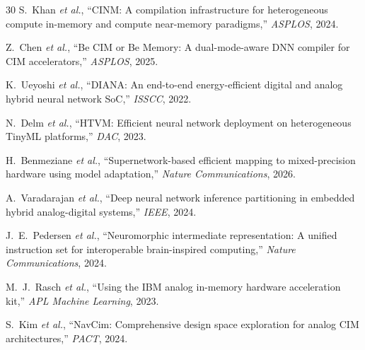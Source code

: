 \documentclass[11pt]{article}
\begin{document}
\begin{thebibliography}{30}
 S.~Khan \textit{et al.}, ``CINM: A compilation infrastructure for heterogeneous compute in-memory and compute near-memory paradigms,'' \textit{ASPLOS}, 2024.

 Z.~Chen \textit{et al.}, ``Be CIM or Be Memory: A dual-mode-aware DNN compiler for CIM accelerators,'' \textit{ASPLOS}, 2025.

 K.~Ueyoshi \textit{et al.}, ``DIANA: An end-to-end energy-efficient digital and analog hybrid neural network SoC,'' \textit{ISSCC}, 2022.

 N.~Delm \textit{et al.}, ``HTVM: Efficient neural network deployment on heterogeneous TinyML platforms,'' \textit{DAC}, 2023.

 H.~Benmeziane \textit{et al.}, ``Supernetwork-based efficient mapping to mixed-precision hardware using model adaptation,'' \textit{Nature Communications}, 2026.

 A.~Varadarajan \textit{et al.}, ``Deep neural network inference partitioning in embedded hybrid analog-digital systems,'' \textit{IEEE}, 2024.

 J.~E.~Pedersen \textit{et al.}, ``Neuromorphic intermediate representation: A unified instruction set for interoperable brain-inspired computing,'' \textit{Nature Communications}, 2024.

 M.~J.~Rasch \textit{et al.}, ``Using the IBM analog in-memory hardware acceleration kit,'' \textit{APL Machine Learning}, 2023.

 S.~Kim \textit{et al.}, ``NavCim: Comprehensive design space exploration for analog CIM architectures,'' \textit{PACT}, 2024.

\end{thebibliography}
\end{document}
